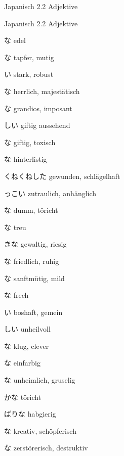 \noindent
\centering
Japanisch 2.2 Adjektive

\begin{multicols*}{2}
\begin{flushleft}
\begin{labeling}{Japanisch 2.2 Adjektive}
	\item [\ruby{高貴}{こうき}な] edel
	\item [\ruby{勇敢}{ゆうかん}な] tapfer, mutig
	\item [\ruby{強}{つよ}い] stark, robust
	\item [\ruby{立派}{りっぱ}な] herrlich, majestätisch
	\item [\ruby{豪快}{ごうかい}な] grandios, imposant
	
	\item [\ruby{毒々}{どくどく}しい] giftig aussehend
	\item [\ruby{有毒}{ゆうどく}な] giftig, toxisch
	\item [\ruby{陰険}{いんけん}な] hinterlistig
	\item [くねくねした] gewunden, schlägelhaft
	
	\item [\ruby{人懐}{ひとなつ}っこい] zutraulich, anhänglich
	\item [\ruby{馬鹿}{ばか}な] dumm, töricht
	\item [\ruby{貞淑}{ていしゅく}な] treu
	
	\item [\ruby{大}{おお}きな] gewaltig, riesig
	\item [\ruby{平安}{へいあん}な] friedlich, ruhig
	\item [\ruby{温厚}{おんこう}な] sanftmütig, mild
	
	\item [\ruby{鉄面皮}{てつめんぴ}な] frech
	\item [\ruby{意地悪}{いじわる}い] boshaft, gemein
	\item [\ruby{禍々}{まがまが}しい] unheilvoll
	\item [\ruby{味}{あじ}な] klug, clever
	\item [\ruby{単色}{たんしょく}な] einfarbig
	\item [\ruby{不気味}{ぶきみ}な] unheimlich, gruselig
	
	\item [\ruby{愚}{おろ}かな] töricht
	\item [\ruby{欲}{よく}ばりな] habgierig
	\item [\ruby{独創的}{どくそうてき}な] kreativ, schöpferisch
	\item [\ruby{破壊的}{はかいてき}な] zerstörerisch, destruktiv
	

\end{labeling}
\end{flushleft}
\end{multicols*}
